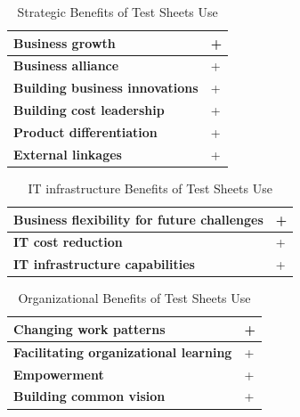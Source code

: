 \begin{table}[h]
	\begin{center}
		\begin{tabular}{| l | l |  }
			\hline
			\textbf{Business growth} & +  \\
			\hline
			\textbf{Business alliance} & + \\
			\hline
			\textbf{Building business innovations} & +  \\
			\hline
			\textbf{Building cost leadership} & + \\
			\hline 
			\textbf{Product differentiation} & + \\
			\hline
			\textbf{External linkages} & + \\
			\hline
		\end{tabular}
	\end{center}
	\caption{Strategic Benefits of Test Sheets Use}
\end{table}

\begin{table}[h]
	\begin{center}
		\begin{tabular}{| l | l |  }
			\hline
			\textbf{Business flexibility for future challenges} & +  \\
			\hline
			\textbf{IT cost reduction} & + \\
			\hline
			\textbf{IT infrastructure capabilities} & +  \\
			\hline
		\end{tabular}
	\end{center}
	\caption{IT infrastructure Benefits of Test Sheets Use}
\end{table}

\begin{table}[h]
	\begin{center}
		\begin{tabular}{| l | l |  }
			\hline
			\textbf{Changing work patterns} & +  \\
			\hline
			\textbf{Facilitating organizational learning} & + \\
			\hline
			\textbf{Empowerment} & +  \\
			\hline
			\textbf{Building common vision} & + \\
			\hline
		\end{tabular}
	\end{center}
	\caption{Organizational Benefits of Test Sheets Use}
\end{table}


